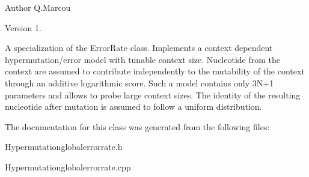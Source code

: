 \begin{DoxyAuthor}{Author}
Q.\+Marcou 
\end{DoxyAuthor}
\begin{DoxyVersion}{Version}
1.
\end{DoxyVersion}
A specialization of the Error\+Rate class. Implements a context dependent hypermutation/error model with tunable context size. Nucleotide from the context are assumed to contribute independently to the mutability of the context through an additive logarithmic score. Such a model contains only 3\+N+1 parameters and allows to probe large context sizes. The identity of the resulting nucleotide after mutation is assumed to follow a uniform distribution. 

The documentation for this class was generated from the following files\+:\begin{DoxyCompactItemize}
\item 
Hypermutationglobalerrorrate.\+h\item 
Hypermutationglobalerrorrate.\+cpp\end{DoxyCompactItemize}
